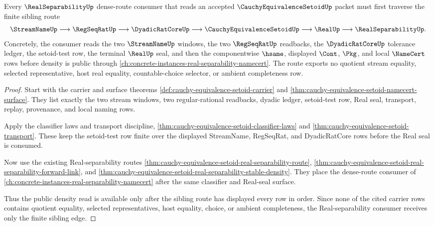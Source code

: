 \begin{theorem}
\label{thm:cauchy-equivalence-setoid-real-separability-sibling-route}
Every $\RealSeparabilityUp$ dense-route consumer that reads an accepted $\CauchyEquivalenceSetoidUp$ packet must first traverse the finite sibling route
$$
\StreamNameUp \longrightarrow \RegSeqRatUp \longrightarrow \DyadicRatCoreUp \longrightarrow \CauchyEquivalenceSetoidUp \longrightarrow \RealUp \longrightarrow \RealSeparabilityUp .
$$
Concretely, the consumer reads the two $\StreamNameUp$ windows, the two $\RegSeqRatUp$ readbacks, the $\DyadicRatCoreUp$ tolerance ledger, the setoid-test row, the terminal $\RealUp$ seal, and then the componentwise $\hsame$, displayed $\Cont$, $\Pkg$, and local $\NameCert$ rows before density is public through \autoref{ch:concrete-instances-real-separability-namecert}. The route exports no quotient stream equality, selected representative, host real equality, countable-choice selector, or ambient completeness row.
\end{theorem}
\begin{proof}
Start with the carrier and surface theorems \autoref{def:cauchy-equivalence-setoid-carrier} and \autoref{thm:cauchy-equivalence-setoid-namecert-surface}. They list exactly the two stream windows, two regular-rational readbacks, dyadic ledger, setoid-test row, Real seal, transport, replay, provenance, and local naming rows.

Apply the classifier laws and transport discipline, \autoref{thm:cauchy-equivalence-setoid-classifier-laws} and \autoref{thm:cauchy-equivalence-setoid-transport}. These keep the setoid-test row finite over the displayed StreamName, RegSeqRat, and DyadicRatCore rows before the Real seal is consumed.

Now use the existing Real-separability routes \autoref{thm:cauchy-equivalence-setoid-real-separability-route}, \autoref{thm:cauchy-equivalence-setoid-real-separability-forward-link}, and \autoref{thm:cauchy-equivalence-setoid-real-separability-stable-density}. They place the dense-route consumer of \autoref{ch:concrete-instances-real-separability-namecert} after the same classifier and Real-seal surface.

Thus the public density read is available only after the sibling route has displayed every row in order. Since none of the cited carrier rows contains quotient equality, selected representatives, host equality, choice, or ambient completeness, the Real-separability consumer receives only the finite sibling edge.
\end{proof}

